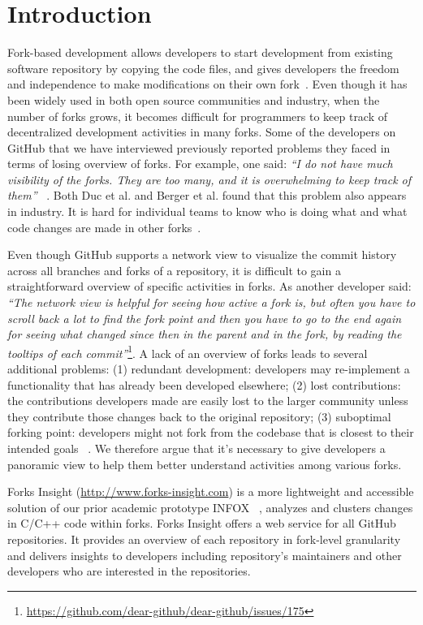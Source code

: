 \section{Introduction}
Fork-based development allows developers to start development from existing software repository by copying the code files, and gives developers the freedom and independence to make modifications on their own fork~\cite{dubinsky2013exploratory, bitzer2006impact, ernst2010code,vetter2007open}. Even though it has been widely used in both open source communities and industry, when the number of forks grows, it becomes difficult for programmers to keep track of decentralized development activities in many forks. Some of the developers on GitHub that we have interviewed previously reported problems they faced in terms of losing overview of forks. For example, one said: \emph{``I do not have much visibility of the forks. They are too many, and it is overwhelming to keep track of them''} ~\cite{ZSLXWK:ICSE18}. Both Duc et al. and Berger et al. found that this problem also appears in industry. It is hard for individual teams to know who is doing what and what code changes are made in other forks~\cite{berger2014three,Duc:2014:FCM:2652524.2652546}.

Even though GitHub supports a network view to visualize the commit history across all branches and forks of a repository, it is difficult to gain a straightforward overview of specific activities in forks. As another developer said: \emph{``The network view is helpful for seeing how active a fork is, but often you have to scroll back a lot to find the fork point and then you have to go to the end again for seeing what changed since then in the parent and in the fork, by reading the tooltips of each commit''}\footnote{\url{https://github.com/dear-github/dear-github/issues/175}}.
 A lack of an overview of forks leads to several additional problems: (1) redundant development: developers may re-implement a functionality that has already been developed elsewhere; (2) lost contributions: the contributions developers made are easily lost to the larger community unless they contribute those changes back to the original repository; (3) suboptimal forking point: developers might not fork from the codebase that is closest to their intended goals ~\cite{ZSLXWK:ICSE18, dubinsky2013exploratory,stanciulescu2015forked}. We therefore argue that it's necessary to give developers a panoramic view to help them better understand activities among various forks.

Forks Insight (\url{http://www.forks-insight.com}) is a more lightweight and accessible solution of our prior academic prototype INFOX ~\cite{ZSLXWK:ICSE18}, analyzes and clusters changes in C/C++ code within forks. Forks Insight offers a web service for all GitHub repositories. It provides an overview of each repository in fork-level granularity and delivers insights to developers including repository's maintainers and other developers who are interested in the repositories.

